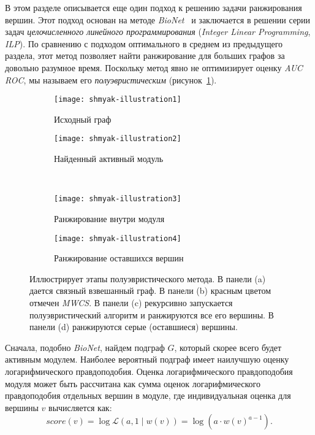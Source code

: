 В этом разделе описывается еще один подход к решению задачи ранжирования
вершин.  Этот подход основан на методе \emph{BioNet}~\cite{Dittrich2008a}
и заключается в решении серии задач \emph{целочисленного линейного
программирования} (\emph{Integer Linear Programming}, \emph{ILP}). По сравнению
с подходом оптимального в среднем из предыдущего раздела, этот метод позволяет
найти ранжирование для больших графов за довольно разумное время.  Поскольку
метод явно не оптимизирует оценку \emph{AUC ROC}, мы называем его
\emph{полуэвристическим} (рисунок~\ref{fig:shranking}).
\begin{figure}
    \begin{subfigure}{.5\textwidth}
        \centering
        \texttt{[image: shmyak-illustration1]}
        \caption{Исходный граф} 
    \end{subfigure}%
    \begin{subfigure}{.5\textwidth}
        \centering
        \texttt{[image: shmyak-illustration2]}
        \caption{Найденный активный модуль}
    \end{subfigure}\\[1ex]
    \begin{subfigure}{.5\textwidth}
        \centering
        \texttt{[image: shmyak-illustration3]}
        \caption{Ранжирование внутри модуля}
    \end{subfigure}%
    \begin{subfigure}{.5\textwidth}
        \centering
        \texttt{[image: shmyak-illustration4]}
        \caption{Ранжирование оставшихся вершин}
    \end{subfigure}
    \centering
    \caption{
        Иллюстрирует этапы полуэвристического метода.  В панели (a) дается
        связный взвешанный граф.  В панели (b) красным цветом отмечен \emph{MWCS}.
        В панели (c) рекурсивно запускается полуэвристический алгоритм
        и ранжируются все его вершины.  В панели (d) ранжируются серые
        (оставшиеся) вершины.
    }%
    \label{fig:shranking}%
\end{figure}
Сначала, подобно \emph{BioNet}, найдем подграф $G$, который скорее всего будет
активным модулем.  Наиболее вероятный подграф имеет наилучшую оценку
логарифмического правдоподобия.  Оценка логарифмического правдоподобия модуля
может быть рассчитана как сумма оценок логарифмического правдоподобия отдельных
вершин в модуле, где индивидуальная оценка для вершины $v$ вычисляется как: \[
    score(v) = \log \mathcal{L} (a, 1 \mid w(v)) = \log(a \cdot {w(v)}^{a - 1}).\]

